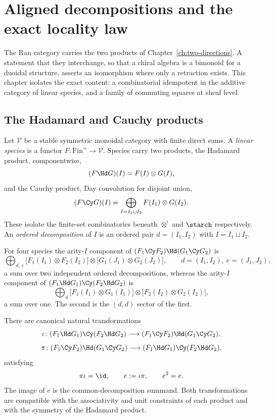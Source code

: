 \chapter{Aligned decompositions and the exact locality law}
\label{ch:aligned-locality}

The Ran category carries the two products of
Chapter~\ref{ch:two-directions}. A statement that they interchange, so
that a chiral algebra is a bimonoid for a duoidal structure, asserts an
isomorphism where only a retraction exists. This chapter isolates the
exact content: a combinatorial idempotent in the additive category of
linear species, and a family of commuting squares at sheaf level.

\section{The Hadamard and Cauchy products}

Let $\mathcal V$ be a stable symmetric monoidal category with finite
direct sums. A \emph{linear species} is a functor $F\colon
\mathrm{Fin}^{\simeq}\to\mathcal V$. Species carry two products, the
Hadamard product, componentwise,
\[
  (F \Hd G)(I) = F(I)\otimes G(I),
\]
and the Cauchy product, Day convolution for disjoint union,
\[
  (F \Cy G)(I) = \bigoplus_{I = I_1\sqcup I_2} F(I_1)\otimes G(I_2).
\]
These isolate the finite-set combinatorics beneath $\otimes^!$ and
$\starch$ respectively. An \emph{ordered decomposition} of $I$ is an
ordered pair $d=(I_1,I_2)$ with $I = I_1\sqcup I_2$.

For four species the arity-$I$ component of
$(F_1\Cy F_2)\Hd(G_1\Cy G_2)$ is
\[
  \bigoplus_{d,\,e}
  \bigl[F_1(I_1)\otimes F_2(I_2)\bigr]\otimes
  \bigl[G_1(J_1)\otimes G_2(J_2)\bigr],
  \qquad d=(I_1,I_2),\ e=(J_1,J_2),
\]
a sum over two independent ordered decompositions, whereas the arity-$I$
component of $(F_1\Hd G_1)\Cy(F_2\Hd G_2)$ is
\[
  \bigoplus_{d}
  \bigl[F_1(I_1)\otimes G_1(I_1)\bigr]\otimes
  \bigl[F_2(I_2)\otimes G_2(I_2)\bigr],
\]
a sum over one. The second is the $(d,d)$ sector of the first.

\begin{theorem}
\label{thm:aligned-splitting}
\StatusProved{} There are canonical natural transformations
\[
  \iota\colon (F_1\Hd G_1)\Cy(F_2\Hd G_2)
    \longrightarrow (F_1\Cy F_2)\Hd(G_1\Cy G_2),
\]
\[
  \pi\colon (F_1\Cy F_2)\Hd(G_1\Cy G_2)
    \longrightarrow (F_1\Hd G_1)\Cy(F_2\Hd G_2),
\]
satisfying
\[
  \pi\iota = \id,\qquad e := \iota\pi,\qquad e^2 = e .
\]
The image of $e$ is the common-decomposition summand. Both
transformations are compatible with the associativity and unit
constraints of each product and with the symmetry of the Hadamard
product.
\end{theorem}

